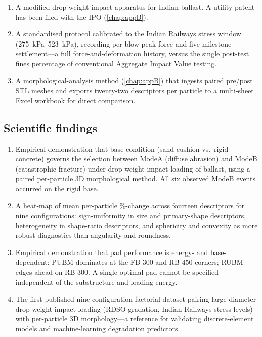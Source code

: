 \begin{enumerate}[label=(\arabic*),leftmargin=*,itemsep=4pt]
    \item A modified drop-weight impact apparatus for Indian ballast. A
          utility patent has been filed with the \gls{IPO}
          (\cref{chap:appB}).
    \item A standardised protocol calibrated to the Indian Railways
          stress window (\SIrange{275}{523}{\kilo\pascal}), recording
          per-blow peak force and five-milestone settlement---a full
          force-and-deformation history, versus the single post-test
          fines percentage of conventional Aggregate Impact Value testing.
    \item A morphological-analysis method (\cref{chap:appB}) that ingests
          paired pre/post \gls{STL} meshes and exports twenty-two
          descriptors per particle to a multi-sheet Excel workbook for
          direct comparison.
\end{enumerate}

\subsection{Scientific findings}
\label{sec:concl-novel-science}

\begin{enumerate}[label=(\arabic*),leftmargin=*,itemsep=4pt]
    \item Empirical demonstration that base condition (sand cushion vs.\
          rigid concrete) governs the selection between \gls{ModeA}
          (diffuse abrasion) and \gls{ModeB} (catastrophic fracture)
          under drop-weight impact loading of ballast, using a paired
          per-particle 3D morphological method. All six observed
          \gls{ModeB} events occurred on the rigid base.
    \item A heat-map of mean per-particle \%-change across fourteen
          descriptors for nine configurations: sign-uniformity in size
          and primary-shape descriptors, heterogeneity in shape-ratio
          descriptors, and sphericity and convexity as more robust
          diagnostics than angularity and roundness.
    \item Empirical demonstration that pad performance is energy- and
          base-dependent: PUBM dominates at the FB-300 and RB-450
          corners; RUBM edges ahead on RB-300. A single optimal pad
          cannot be specified independent of the substructure and
          loading energy.
    \item The first published nine-configuration factorial dataset
          pairing large-diameter drop-weight impact loading (\gls{RDSO}
          gradation, Indian Railways stress levels) with per-particle
          3D morphology---a reference for validating discrete-element
          models and machine-learning degradation predictors.
\end{enumerate}

